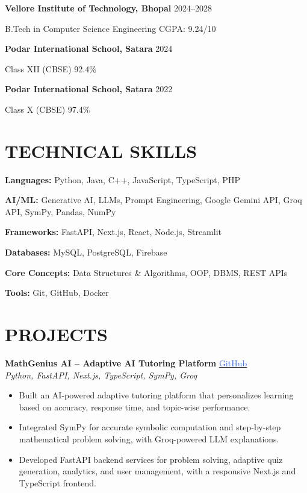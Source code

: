 \documentclass[a4paper,10pt]{article}
\begin{document}
\textbf{Vellore Institute of Technology, Bhopal} \hfill 2024--2028

B.Tech in Computer Science Engineering \hfill CGPA: 9.24/10

\vspace{2mm}

\textbf{Podar International School, Satara} \hfill 2024

Class XII (CBSE) \hfill 92.4\%

\vspace{2mm}

\textbf{Podar International School, Satara} \hfill 2022

Class X (CBSE) \hfill 97.4\%


\section*{TECHNICAL SKILLS}

\textbf{Languages:} Python, Java, C++, JavaScript, TypeScript, PHP

\textbf{AI/ML:} Generative AI, LLMs, Prompt Engineering, Google Gemini API, Groq API, SymPy, Pandas, NumPy

\textbf{Frameworks:} FastAPI, Next.js, React, Node.js, Streamlit

\textbf{Databases:} MySQL, PostgreSQL, Firebase

\textbf{Core Concepts:} Data Structures \& Algorithms, OOP, DBMS, REST APIs

\textbf{Tools:} Git, GitHub, Docker


\section*{PROJECTS}

\textbf{MathGenius AI -- Adaptive AI Tutoring Platform}
\hfill
\href{https://github.com/ddikshamitraa25/MathGenius-AI-Improved}{\textcolor{RoyalBlue}{GitHub}}
\\
\textit{Python, FastAPI, Next.js, TypeScript, SymPy, Groq}
\begin{itemize}
\item Built an AI-powered adaptive tutoring platform that personalizes learning based on accuracy, response time, and topic-wise performance.
\item Integrated SymPy for accurate symbolic computation and step-by-step mathematical problem solving, with Groq-powered LLM explanations.
\item Developed FastAPI backend services for problem solving, adaptive quiz generation, analytics, and user management, with a responsive Next.js and TypeScript frontend.
\end{itemize}
\end{document}

